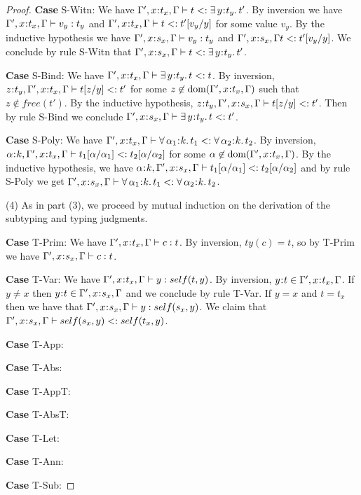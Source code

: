 \documentclass[11pt]{article}
\newcommand{\al}{\alpha}
\newcommand{\bind}{\hspace{0.05em}{:}\hspace{0.05em}} %
\newcommand{\existype}[3]{\exists\, #1\bind #2.\, #3}
\newcommand{\polytype}[3]{\forall\, #1\bind #2.\, #3}
\newcommand{\dom}[1]{{\rm dom}(#1)}
\begin{document}
\begin{proof}
{\bf Case} {\sc S-Witn}: We have $\Gamma', x\bind t_x, \Gamma \vdash t <: \existype{y}{t_y}{t'}$. By inversion we have $\Gamma', x\bind t_x, \Gamma \vdash v_y : t_y$ and $\Gamma', x\bind t_x, \Gamma \vdash t <: t'[v_y/y]$ for some value $v_y$. By the inductive hypothesis we have $\Gamma', x\bind s_x, \Gamma \vdash v_y : t_y$ and $\Gamma', x\bind s_x, \Gamma t <: t'[v_y/y]$. We conclude by rule {\sc S-Witn} that $\Gamma', x\bind s_x, \Gamma \vdash t <: \existype{y}{t_y}{t'}$.

{\bf Case} {\sc S-Bind}: We have $\Gamma', x\bind t_x, \Gamma \vdash \existype{y}{t_y}{t}<: t$. By inversion, $z\bind t_y,\Gamma', x\bind t_x, \Gamma \vdash t[z/y] <: t'$ for some $z\not\in\dom{\Gamma', x\bind t_x, \Gamma}$ such that $z \not\in free(t')$. By the inductive hypothesis, $z\bind t_y, \Gamma', x\bind s_x, \Gamma \vdash t[z/y] <: t'$. Then by rule {\sc S-Bind} we conclude $\Gamma', x\bind s_x, \Gamma \vdash \existype{y}{t_y}{t} <: t'$.

{\bf Case} {\sc S-Poly}: We have $\Gamma', x\bind t_x, \Gamma \vdash \polytype{\al_1}{k}{t_1}<: \polytype{\al_2}{k}{t_2}$. By inversion, $\al\bind k, \Gamma', x\bind t_x, \Gamma \vdash t_1[\al/\al_1] <: t_2[\al/\al_2]$ for some $\al\not\in\dom{\Gamma', x\bind t_x, \Gamma}$. By the inductive hypothesis, we have $\al\bind k, \Gamma', x\bind s_x, \Gamma \vdash t_1[\al/\al_1] <: t_2[\al/\al_2]$ and by rule {\sc S-Poly} we get $\Gamma', x\bind s_x, \Gamma \vdash \polytype{\al_1}{k}{t_1} <: \polytype{\al_2}{k}{t_2}$.

(4) As in part (3), we proceed by mutual induction on the derivation of the subtyping and typing judgments.

{\bf Case} {\sc T-Prim}: We have $\Gamma', x\bind t_x, \Gamma \vdash c : t$. By inversion, $ty(c) = t$, so by {\sc T-Prim} we have $\Gamma', x\bind s_x, \Gamma \vdash c : t$.

{\bf Case} {\sc T-Var}: We have $\Gamma', x\bind t_x, \Gamma \vdash y : self(t,y)$. By inversion, $y\bind t \in \Gamma', x\bind t_x, \Gamma$. If $y\neq x$ then $y\bind t \in \Gamma', x\bind s_x, \Gamma$ and we conclude by rule {\sc T-Var}. If $y = x$ and $t = t_x$ then we have that $\Gamma', x\bind s_x, \Gamma \vdash y : self(s_x, y)$. 
We claim that $\Gamma', x\bind s_x, \Gamma \vdash self(s_x, y) <: self(t_x, y)$.

{\bf Case} {\sc T-App}:

{\bf Case} {\sc T-Abs}:

{\bf Case} {\sc T-AppT}:

{\bf Case} {\sc T-AbsT}:

{\bf Case} {\sc T-Let}:

{\bf Case} {\sc T-Ann}:

{\bf Case} {\sc T-Sub}:

\end{proof}
\end{document}
